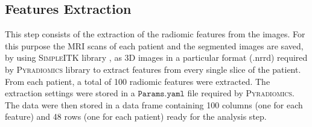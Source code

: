 \documentclass{standalone}
\begin{document}
\subsection{Features Extraction}

This step consists of the extraction of the radiomic features from the images.
For this purpose the MRI scans of each patient and the segmented images are saved, by using \textsc{SimpleITK} library \cite{SimpleITK}, as 3D images in a particular format (.nrrd) required by \textsc{Pyradiomics} library \cite{Pyradiomics} to extract features from every single slice of the patient. 
From each patient, a total of 100 radiomic features were extracted.
The extraction settings were stored in a $\mathtt{Params.yaml}$ file required by \textsc{Pyradiomics}.
The data were then stored in a data frame containing 100 columns (one for each feature) and 48 rows (one for each patient) ready for the analysis step.
\end{document}
